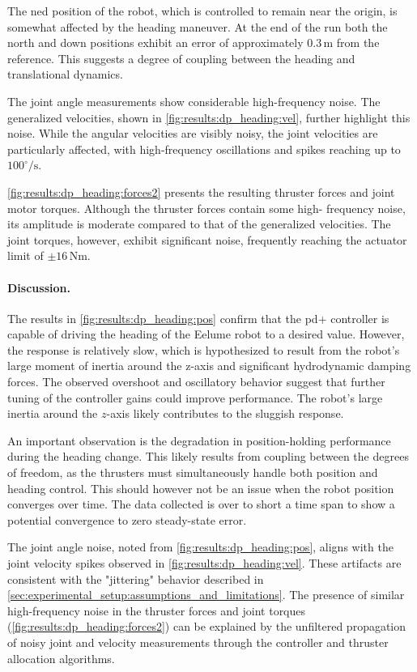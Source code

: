 The \gls{ned} position of the robot, which is controlled to remain near the 
origin, is somewhat affected by the heading maneuver. At the end of the run both the north and down 
positions exhibit an error of approximately \(0.3\,\mathrm{m}\) 
from the reference. This suggests a degree of coupling between the heading and 
translational dynamics. 

The joint angle measurements show considerable high-frequency noise.
The generalized velocities, shown in \autoref{fig:results:dp_heading:vel}, 
further highlight this noise. While the angular velocities are visibly noisy, 
the joint velocities are particularly affected, with high-frequency 
oscillations and spikes reaching up to \(100^\circ/\mathrm{s}\).

\autoref{fig:results:dp_heading:forces2} presents the resulting thruster 
forces and joint motor torques. Although the thruster forces contain some high-
frequency noise, its amplitude is moderate compared to that of the generalized 
velocities. The joint torques, however, exhibit significant noise, frequently 
reaching the actuator limit of \(\pm16\,\mathrm{Nm}\).

\paragraph{Discussion.}

The results in \autoref{fig:results:dp_heading:pos} confirm that the \gls{pd+} 
controller is capable of driving the heading of the Eelume robot to a desired 
value.
However, the response is relatively slow, which is hypothesized to result from the robot’s large moment of inertia around the z-axis and significant hydrodynamic damping forces.
The observed overshoot and oscillatory behavior suggest that further 
tuning of the controller gains could improve performance. The robot's large 
inertia around the \(z\)-axis likely contributes to the sluggish response.

An important observation is the degradation in position-holding performance 
during the heading change. This likely results from coupling between the 
degrees of freedom, as the thrusters must simultaneously handle both position 
and heading control. This should however not be an issue when the robot position converges over time.
The data collected is over to short a time span to show a potential convergence to zero
steady-state error.

The joint angle noise, noted from \autoref{fig:results:dp_heading:pos}, aligns 
with the joint velocity spikes observed in \autoref{fig:results:dp_heading:vel}.
These artifacts are consistent with the "jittering" behavior described in
\autoref{sec:experimental_setup:assumptions_and_limitations}. The presence of 
similar high-frequency noise in the thruster forces and joint torques
(\autoref{fig:results:dp_heading:forces2}) can be explained by the unfiltered 
propagation of noisy joint and velocity measurements through the controller 
and thruster allocation algorithms.

